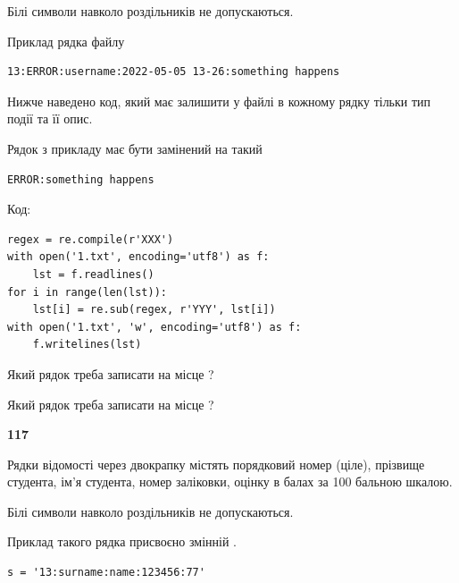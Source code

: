 Білі символи навколо роздільників не допускаються.

Приклад рядка файлу



\begin{verbatim}
13:ERROR:username:2022-05-05 13-26:something happens
\end{verbatim}


Нижче наведено код, який має залишити у файлі в кожному рядку тільки тип події та її опис.

Рядок з прикладу має бути замінений на такий



\begin{verbatim}
ERROR:something happens
\end{verbatim}




Код:



\begin{verbatim}
regex = re.compile(r'XXX')
with open('1.txt', encoding='utf8') as f:
    lst = f.readlines()
for i in range(len(lst)):
    lst[i] = re.sub(regex, r'YYY', lst[i])
with open('1.txt', 'w', encoding='utf8') as f:
    f.writelines(lst)
\end{verbatim}









Який рядок треба записати на місце  ?\par
\vspace{5mm}


Який рядок треба записати на місце  ?\par


\newpage

{\begin {center}\textbf{ 117}\end {center}}\par
Рядки відомості через двокрапку містять порядковий номер (ціле), пріз\-ви\-ще студен\-та, ім'я студента, номер заліковки, оцінку в балах за 100 бальною шкалою.

Білі символи навколо роздільників не допускаються.

Приклад такого рядка присвоєно змінній .



\begin{verbatim}
s = '13:surname:name:123456:77'
\end{verbatim}


